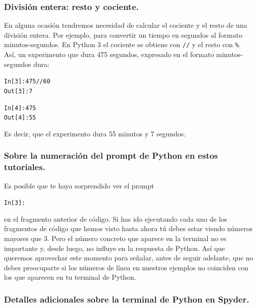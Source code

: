 \documentclass[10pt,a4paper]{article}\usepackage[]{graphicx}\usepackage[]{color}
\makeatletter
\newenvironment{kframe}{%
 \def\at@end@of@kframe{}%
 \ifinner\ifhmode%
  \def\at@end@of@kframe{\end{minipage}}%
  \begin{minipage}{\columnwidth}%
 \fi\fi%
 \def\FrameCommand##1{\hskip\@totalleftmargin \hskip-\fboxsep
 \colorbox{shadecolor}{##1}\hskip-\fboxsep
     \hskip-\linewidth \hskip-\@totalleftmargin \hskip\columnwidth}%
 \MakeFramed {\advance\hsize-\width
   \@totalleftmargin\z@ \linewidth\hsize
   \@setminipage}}%
 {\par\unskip\endMakeFramed%
 \at@end@of@kframe}
\newenvironment{knitrout}{}{} %
\makeatother
\begin{document}
\subsubsection*{División entera: resto y cociente.}

En alguna ocasión tendremos necesidad de calcular el cociente y el resto de una división entera. Por ejemplo, para convertir un tiempo en segundos al formato minutos-segundos. En Python 3 el cociente se obtiene con {\tt //} y el resto con \verb#%#. Así, un experimento que dura 475 segundos, expresado en el formato minutos-segundos dura:
\begin{knitrout}
\color{fgcolor}\begin{kframe}
\begin{alltt}
In [3]: 475 // 60
Out[3]: 7

In [4]: 475 %
Out[4]: 55
\end{alltt}
\end{kframe}
\end{knitrout}
Es decir, que el experimento dura 55 minutos y 7 segundos. 


\subsubsection*{Sobre la numeración del prompt de Python en estos tutoriales.}

Es posible que te haya sorprendido ver el prompt 
\begin{knitrout}
\color{fgcolor}\begin{kframe}
\begin{alltt}
In [3]:
\end{alltt}
\end{kframe}
\end{knitrout}
en el fragmento anterior de código. Si has ido ejecutando cada uno de los fragmentos de código que hemos visto hasta ahora tú debes estar viendo números mayores que 3. Pero el número concreto que aparece en la terminal no es importante y, desde luego, no influye en la respuesta de Python. Así que queremos aprovechar este momento para señalar, antes de seguir adelante, que no debes preocuparte si los números de línea en nuestros ejemplos no coinciden con los que aparecen en tu terminal de Python.   

\subsubsection*{Detalles adicionales sobre la terminal de Python en Spyder.}
\end{document}
